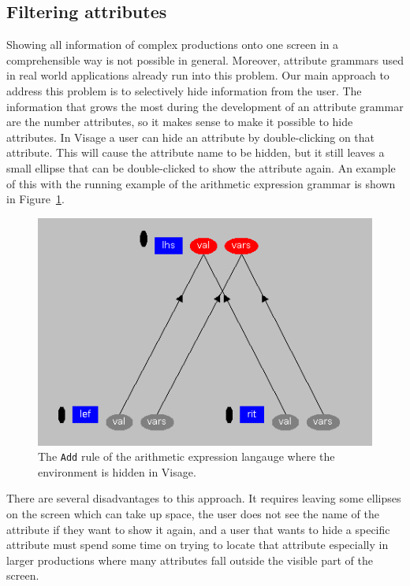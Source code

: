 \documentclass[11pt]{article}
\begin{document}
\subsection{Filtering attributes}

Showing all information of complex productions onto one screen in a comprehensible way is not possible in general.
Moreover, attribute grammars used in real world applications already run into this problem.
Our main approach to address this problem is to selectively hide information from the user.
The information that grows the most during the development of an attribute grammar are the number attributes, so it makes sense to make it possible to hide attributes.
In Visage a user can hide an attribute by double-clicking on that attribute.
This will cause the attribute name to be hidden, but it still leaves a small ellipse that can be double-clicked to show the attribute again.
An example of this with the running example of the arithmetic expression grammar is shown in Figure~\ref{hidden-visage}.

\begin{figure}[h]
  \centering
  \includegraphics[scale=0.6]{hidden-visage}
  \caption{The \texttt{Add} rule of the arithmetic expression langauge where the environment is hidden in Visage.}
  \label{hidden-visage}
\end{figure}

There are several disadvantages to this approach. It requires leaving some ellipses on the screen which can take up space, the user does not see the name of the attribute if they want to show it again, and a user that wants to hide a specific attribute must spend some time on trying to locate that attribute especially in larger productions where many attributes fall outside the visible part of the screen.
\end{document}
